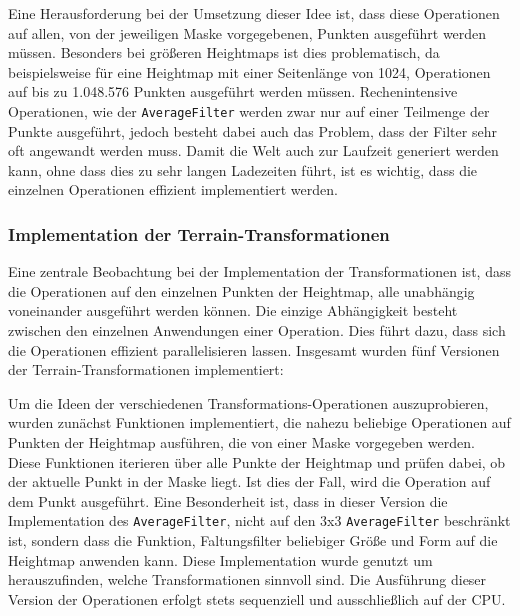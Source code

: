 Eine Herausforderung bei der Umsetzung dieser Idee ist, dass diese Operationen auf allen, von der jeweiligen Maske vorgegebenen, Punkten ausgeführt werden müssen.
Besonders bei größeren Heightmaps ist dies problematisch, da beispielsweise für eine Heightmap mit einer Seitenlänge von 1024, Operationen auf bis zu 1.048.576 Punkten ausgeführt werden müssen.
Rechenintensive Operationen, wie der \texttt{AverageFilter} werden zwar nur auf einer Teilmenge der Punkte ausgeführt, jedoch besteht dabei auch das Problem, dass der Filter sehr oft angewandt werden muss.
Damit die Welt auch zur Laufzeit generiert werden kann, ohne dass dies zu sehr langen Ladezeiten führt, ist es wichtig, dass die einzelnen Operationen effizient implementiert werden.


\subsubsection{Implementation der Terrain-Transformationen}
Eine zentrale Beobachtung bei der Implementation der Transformationen ist, dass die Operationen auf den einzelnen Punkten der Heightmap, alle unabhängig voneinander ausgeführt werden können.
Die einzige Abhängigkeit besteht zwischen den einzelnen Anwendungen einer Operation.
Dies führt dazu, dass sich die Operationen effizient parallelisieren lassen.
Insgesamt wurden fünf Versionen der Terrain-Transformationen implementiert:

Um die Ideen der verschiedenen Transformations-Operationen auszuprobieren, wurden zunächst Funktionen implementiert, die nahezu beliebige Operationen auf Punkten der Heightmap ausführen, die von einer Maske vorgegeben werden.
Diese Funktionen iterieren über alle Punkte der Heightmap und prüfen dabei, ob der aktuelle Punkt in der Maske liegt.
Ist dies der Fall, wird die Operation auf dem Punkt ausgeführt.
Eine Besonderheit ist, dass in dieser Version die Implementation des \texttt{AverageFilter}, nicht auf den 3x3 \texttt{AverageFilter} beschränkt ist, sondern dass die Funktion, Faltungsfilter beliebiger Größe und Form auf die Heightmap anwenden kann.
Diese Implementation wurde genutzt um herauszufinden, welche Transformationen sinnvoll sind.
Die Ausführung dieser Version der Operationen erfolgt stets sequenziell und ausschließlich auf der CPU.

